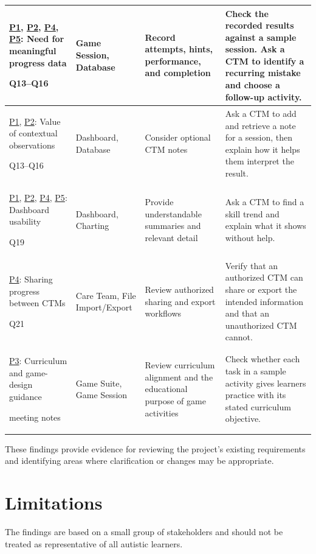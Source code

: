 \documentclass[12pt, titlepage]{article}
\begin{document}
\begin{longtable}{|p{}|p{}|p{}|p{}|}
\hyperref[app:participant-1]{P1}, \hyperref[app:participant-2]{P2}, \hyperref[app:participant-4]{P4}, \hyperref[app:participant-5]{P5}: Need for meaningful progress data\par {\small Q13--Q16} & Game Session, Database & Record attempts, hints, performance, and completion & Check the recorded results against a sample session. Ask a CTM to identify a recurring mistake and choose a follow-up activity. \\ \hline
\hyperref[app:participant-1]{P1}, \hyperref[app:participant-2]{P2}: Value of contextual observations\par {\small Q13--Q16} & Dashboard, Database & Consider optional CTM notes & Ask a CTM to add and retrieve a note for a session, then explain how it helps them interpret the result. \\ \hline
\hyperref[app:participant-1]{P1}, \hyperref[app:participant-2]{P2}, \hyperref[app:participant-4]{P4}, \hyperref[app:participant-5]{P5}: Dashboard usability\par {\small Q19} & Dashboard, Charting & Provide understandable summaries and relevant detail & Ask a CTM to find a skill trend and explain what it shows without help. \\ \hline
\hyperref[app:participant-4]{P4}: Sharing progress between CTMs\par {\small Q21} & Care Team, File Import/Export & Review authorized sharing and export workflows & Verify that an authorized CTM can share or export the intended information and that an unauthorized CTM cannot. \\ \hline
\hyperref[app:participant-3]{P3}: Curriculum and game-design guidance\par {\small meeting notes} & Game Suite, Game Session & Review curriculum alignment and the educational purpose of game activities & Check whether each task in a sample activity gives learners practice with its stated curriculum objective. \\ \hline
\end{longtable}

These findings provide evidence for reviewing the project's existing requirements and identifying areas where clarification or changes may be appropriate.

\section{Limitations}

The findings are based on a small group of stakeholders and should not be treated as representative of all autistic learners.
\end{document}
